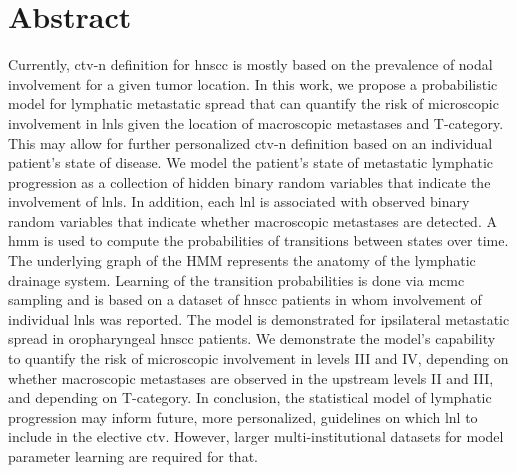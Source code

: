 \documentclass[\relativeRoot/main.tex]{subfiles}
\begin{document}
\section{Abstract}
\label{sec:unilateral:abstract}

Currently, \gls{ctv-n} definition for \gls{hnscc} is mostly based on the prevalence of nodal involvement for a given tumor location. In this work, we propose a probabilistic model for lymphatic metastatic spread that can quantify the risk of microscopic involvement in \glspl{lnl} given the location of macroscopic metastases and T-category. This may allow for further personalized \gls{ctv-n} definition based on an individual patient's state of disease. We model the patient's state of metastatic lymphatic progression as a collection of hidden binary random variables that indicate the involvement of \glspl{lnl}. In addition, each \gls{lnl} is associated with observed binary random variables that indicate whether macroscopic metastases are detected. A \gls{hmm} is used to compute the probabilities of transitions between states over time. The underlying graph of the HMM represents the anatomy of the lymphatic drainage system. Learning of the transition probabilities is done via \gls{mcmc} sampling and is based on a dataset of \gls{hnscc} patients in whom involvement of individual \glspl{lnl} was reported. The model is demonstrated for ipsilateral metastatic spread in oropharyngeal \gls{hnscc} patients. We demonstrate the model's capability to quantify the risk of microscopic involvement in levels III and IV, depending on whether macroscopic metastases are observed in the upstream levels II and III, and depending on T-category. In conclusion, the statistical model of lymphatic progression may inform future, more personalized, guidelines on which \gls{lnl} to include in the elective \acrshort{ctv}. However, larger multi-institutional datasets for model parameter learning are required for that.
\end{document}
